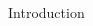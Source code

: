 \documentclass[final]{beamer} %
\begin{document}
\begin{frame}
\begin{columns}[t]
\begin{column}{0.32\textwidth}
\begin{block}{Introduction}
      
      
      \end{block}


\end{column}
\end{columns}
\end{frame}
\end{document}
